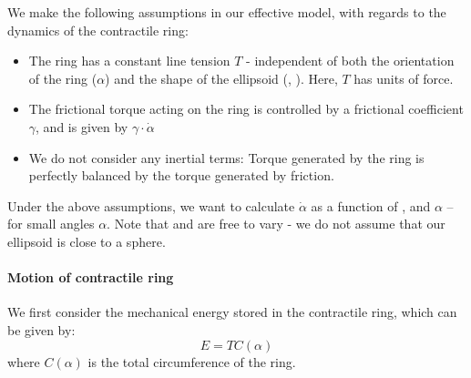 We make the following assumptions in our effective model, with regards to the dynamics of the contractile ring:
\begin{itemize}
    \item The ring has a constant line tension $T$ - independent of both the orientation of the ring ($\alpha$) and the shape of the ellipsoid (\longAxisLength, \shortAxisLength). Here, $T$ has units of force.
    \item The frictional torque acting on the ring is controlled by a frictional coefficient $\gamma$, and is given by $\gamma\cdot\dot{\alpha}$
    \item We do not consider any inertial terms: Torque generated by the ring is perfectly balanced by the torque generated by friction.
\end{itemize}                                                                             
Under the above assumptions, we want to calculate $\dot{\alpha}$ as a function of \longAxisLength, \shortAxisLength and $\alpha$ -- for small angles $\alpha$. Note that \longAxisLength and \shortAxisLength are free to vary - we do not assume that our ellipsoid is close to a sphere.

\paragraph{Motion of contractile ring}
We first consider the mechanical energy stored in the contractile ring, which can be given by:
\begin{equation} \label{eq:energyDef}
    E = TC(\alpha)
\end{equation}
where $C(\alpha)$ is the total circumference of the ring.

